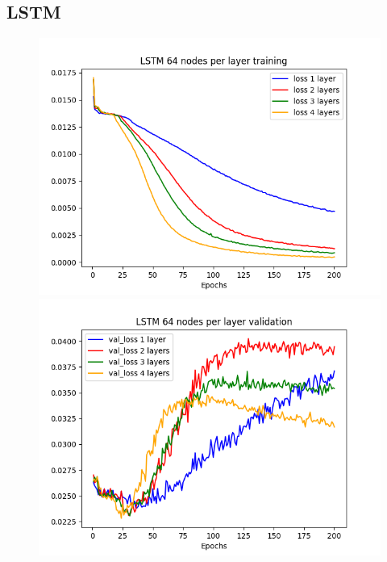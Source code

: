 \documentclass[11pt]
{article}
\begin{document}
\subsection{LSTM}
\begin{figure}[H] 
	\hspace*{-2cm}  
	\begin{minipage}[b]{0.33\linewidth}
		\centering
		\includegraphics[width=\linewidth]{../TESTS_RESULTS/LSTM_tests/plots/64_training.png} 
	\end{minipage}%
	\begin{minipage}[b]{0.33\linewidth}
		\centering
		\includegraphics[width=\linewidth]{../TESTS_RESULTS/LSTM_tests/plots/64_validation.png} 
	\end{minipage} 

\end{figure}
\end{document}
